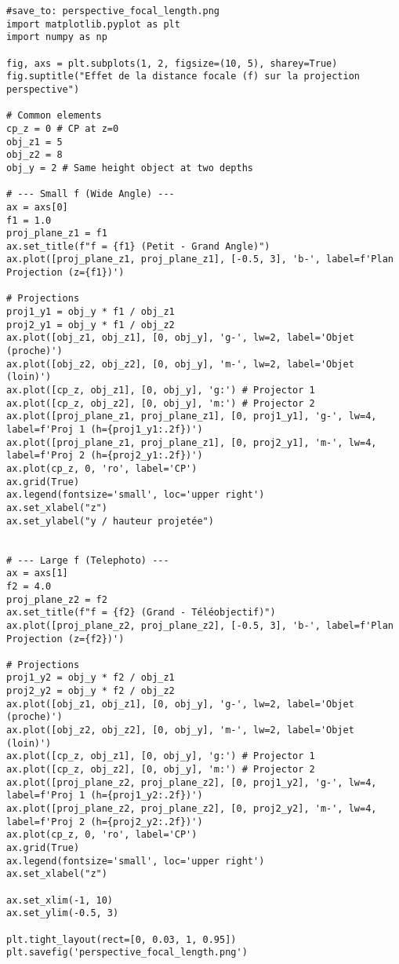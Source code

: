 \documentclass{article}
\begin{document}
\begin{verbatim}
#save_to: perspective_focal_length.png
import matplotlib.pyplot as plt
import numpy as np

fig, axs = plt.subplots(1, 2, figsize=(10, 5), sharey=True)
fig.suptitle("Effet de la distance focale (f) sur la projection perspective")

# Common elements
cp_z = 0 # CP at z=0
obj_z1 = 5
obj_z2 = 8
obj_y = 2 # Same height object at two depths

# --- Small f (Wide Angle) ---
ax = axs[0]
f1 = 1.0
proj_plane_z1 = f1
ax.set_title(f"f = {f1} (Petit - Grand Angle)")
ax.plot([proj_plane_z1, proj_plane_z1], [-0.5, 3], 'b-', label=f'Plan Projection (z={f1})')

# Projections
proj1_y1 = obj_y * f1 / obj_z1
proj2_y1 = obj_y * f1 / obj_z2
ax.plot([obj_z1, obj_z1], [0, obj_y], 'g-', lw=2, label='Objet (proche)')
ax.plot([obj_z2, obj_z2], [0, obj_y], 'm-', lw=2, label='Objet (loin)')
ax.plot([cp_z, obj_z1], [0, obj_y], 'g:') # Projector 1
ax.plot([cp_z, obj_z2], [0, obj_y], 'm:') # Projector 2
ax.plot([proj_plane_z1, proj_plane_z1], [0, proj1_y1], 'g-', lw=4, label=f'Proj 1 (h={proj1_y1:.2f})')
ax.plot([proj_plane_z1, proj_plane_z1], [0, proj2_y1], 'm-', lw=4, label=f'Proj 2 (h={proj2_y1:.2f})')
ax.plot(cp_z, 0, 'ro', label='CP')
ax.grid(True)
ax.legend(fontsize='small', loc='upper right')
ax.set_xlabel("z")
ax.set_ylabel("y / hauteur projetée")


# --- Large f (Telephoto) ---
ax = axs[1]
f2 = 4.0
proj_plane_z2 = f2
ax.set_title(f"f = {f2} (Grand - Téléobjectif)")
ax.plot([proj_plane_z2, proj_plane_z2], [-0.5, 3], 'b-', label=f'Plan Projection (z={f2})')

# Projections
proj1_y2 = obj_y * f2 / obj_z1
proj2_y2 = obj_y * f2 / obj_z2
ax.plot([obj_z1, obj_z1], [0, obj_y], 'g-', lw=2, label='Objet (proche)')
ax.plot([obj_z2, obj_z2], [0, obj_y], 'm-', lw=2, label='Objet (loin)')
ax.plot([cp_z, obj_z1], [0, obj_y], 'g:') # Projector 1
ax.plot([cp_z, obj_z2], [0, obj_y], 'm:') # Projector 2
ax.plot([proj_plane_z2, proj_plane_z2], [0, proj1_y2], 'g-', lw=4, label=f'Proj 1 (h={proj1_y2:.2f})')
ax.plot([proj_plane_z2, proj_plane_z2], [0, proj2_y2], 'm-', lw=4, label=f'Proj 2 (h={proj2_y2:.2f})')
ax.plot(cp_z, 0, 'ro', label='CP')
ax.grid(True)
ax.legend(fontsize='small', loc='upper right')
ax.set_xlabel("z")

ax.set_xlim(-1, 10)
ax.set_ylim(-0.5, 3)

plt.tight_layout(rect=[0, 0.03, 1, 0.95])
plt.savefig('perspective_focal_length.png')
\end{verbatim}
\end{document}
